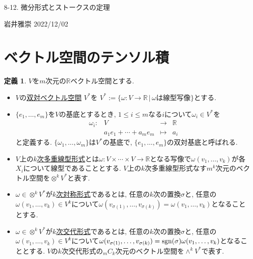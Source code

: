 \documentclass[dvipdfmx,a4paper,11pt]{article}
\newcommand{\R}{\mathbb{R}}
\newcommand{\sgn}{{\rm sgn}}
\theoremstyle{definition}
\newtheorem{dfn}[thm]{定義}
\begin{document}


\begin{center}
{\Large 8-12. 微分形式とストークスの定理}
\end{center}
\begin{flushright}
 岩井雅崇 2022/12/02
\end{flushright}

\section{ベクトル空間のテンソル積}

    \begin{tcolorbox}[
    colback = white,
    colframe = green!35!black,
    fonttitle = \bfseries,
    breakable = true]
\begin{dfn}
$V$を$m$次元の$\R$ベクトル空間とする.
\begin{itemize}
 \setlength{\parskip}{0cm}
  \setlength{\itemsep}{2pt} 
\item $V$の\underline{双対ベクトル空間} $V^{*}$を
$
V^{*} := \{\omega : V \rightarrow \R  \,|\, \text{$\omega$は線型写像} \}
\text{とする.}
$
\item $\{ e_1, \ldots, e_m\}$を$V$の基底とするとき, $1 \le i \le m$なる$i$について$\omega_{i} \in V^{*}$を
     $$
      \begin{matrix}
     \omega_{i} : &V & \rightarrow &\R\\
      &a_1e_1 + \cdots +a_m e_m& \mapsto& a_i
       \end{matrix}
      $$
 と定義する. $\{ \omega_1, \ldots, \omega_m\}$は$V^{*}$の基底で, $\{ e_1, \ldots, e_m\}$の双対基底と呼ばれる.
 \item $V$上の\underline{$k$次多重線型形式}とは$\omega : V \times \cdots \times V \rightarrow \R$となる写像で$\omega(v_1, \ldots, v_k)$が各$X_i$について線型であることとする. $V$上の$k$次多重線型形式なす$m^k$次元のベクトル空間を$\otimes^{k} V^{*}$と表す.
   \item $\omega \in \otimes^{k} V^{*}$が\underline{$k$次対称形式}であるとは, 任意の$k$次の置換$\sigma$と, 任意の$\omega(v_1, \ldots, v_k) \in V^{k}$について$\omega(v_{\sigma(1)}, \ldots, v_{\sigma(k)})=\omega(v_1, \ldots, v_k)$となることとする.
  \item $\omega \in \otimes^{k} V^{*}$が\underline{$k$次交代形式}であるとは, 任意の$k$次の置換$\sigma$と, 任意の$\omega(v_1, \ldots, v_k) \in V^{k}$について$\omega(v_{\sigma(1)}, \ldots, v_{\sigma(k)})=\sgn(\sigma)\omega(v_1, \ldots, v_k)$となることとする. $V$の$k$次交代形式の${}_m C_{k}$次元のベクトル空間を$\wedge^{k} V^{*}$で表す. 
\end{itemize}

    \end{dfn}
    \end{tcolorbox}
\end{document}
